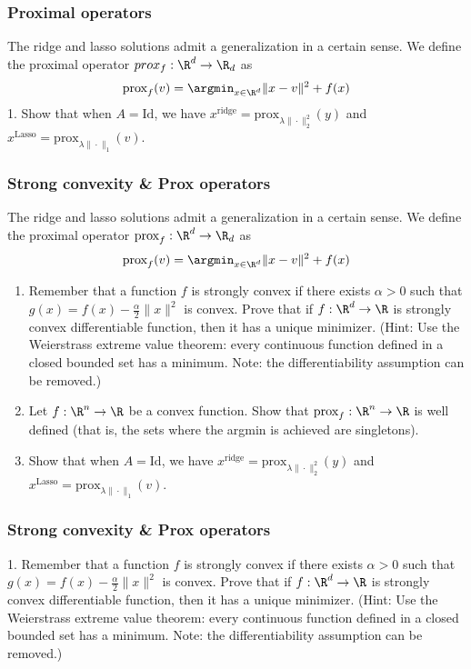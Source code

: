 \documentclass{beamer}
\begin{document}
\begin{frame}[t]
\frametitle{Proximal operators}
The ridge and lasso solutions admit a generalization in a certain sense. We define the proximal operator $prox_f : \R^d \rightarrow \R_d$ as
\begin{align*}
\text{prox}_f(v) = \argmin_{x \in \R^d} \|x-v\|^2 + f(x)
\end{align*}
1. Show that when $A=\text{Id}$, we have $x^{\text{ridge}} = \text{prox}_{\lambda \|\cdot\|_2^2}(y)$ and $x^{\text{Lasso}} = \text{prox}_{\lambda \|\cdot\|_1}(v)$.
\pause
\end{frame}

\begin{frame}[t]
\frametitle{Strong convexity \& Prox operators}
\vspace{-5pt}
The ridge and lasso solutions admit a generalization in a certain sense. We define the proximal operator $\text{prox}_f : \R^d \rightarrow \R_d$ as
\begin{align*}
\text{prox}_f(v) = \argmin_{x \in \R^d} \|x-v\|^2 + f(x)
\end{align*}
\begin{enumerate}
\item Remember that a function $f$ is strongly convex if there exists $\alpha > 0$ such that $g(x) = f(x) - \frac{\alpha}{2} \|x\|^2$ is convex. Prove that if $f : \R^d \rightarrow \R$ is strongly convex differentiable function, then it has a unique minimizer. (Hint: Use the Weierstrass extreme value theorem: every continuous function defined in a closed bounded set has a minimum. Note: the differentiability assumption can be removed.)
\item Let $f : \R^n \rightarrow \R$ be a convex function. Show that $\text{prox}_f : \R^n \rightarrow \R$ is well defined (that is, the sets where the argmin is achieved are singletons).
\item Show that when $A=\text{Id}$, we have $x^{\text{ridge}} = \text{prox}_{\lambda \|\cdot\|_2^2}(y)$ and $x^{\text{Lasso}} = \text{prox}_{\lambda \|\cdot\|_1}(v)$.
\end{enumerate}
\pause
\end{frame}

\begin{frame}[t]
\frametitle{Strong convexity \& Prox operators}
\vspace{-5pt}
1. Remember that a function $f$ is strongly convex if there exists $\alpha > 0$ such that $g(x) = f(x) - \frac{\alpha}{2} \|x\|^2$ is convex. Prove that if $f : \R^d \rightarrow \R$ is strongly convex differentiable function, then it has a unique minimizer. (Hint: Use the Weierstrass extreme value theorem: every continuous function defined in a closed bounded set has a minimum. Note: the differentiability assumption can be removed.)
\pause
\pause
\end{frame}
\end{document}

